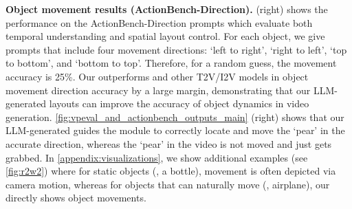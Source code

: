 \documentclass{article}
\begin{document}
\vspace{3pt}
\noindent\textbf{Object movement results (ActionBench-Direction).}
 (right) shows the performance on the ActionBench-Direction prompts which evaluate both temporal understanding and spatial layout control.
For each object, we give prompts that include four movement directions: ‘left to right’, ‘right to left’, ‘top to bottom’, and ‘bottom to top’. Therefore, for a random guess, the movement accuracy is 25\%.
Our \method{} outperforms \modelscope{} and other T2V/I2V models in object movement direction accuracy by a large margin, demonstrating that our LLM-generated layouts can improve the accuracy of object dynamics in video generation.
\cref{fig:vpeval_and_actionbench_outputs_main} (right) shows that our LLM-generated \videoplan{} guides the \videomodule{} module to correctly locate and move the `pear' in the accurate direction,
whereas the `pear' in the \modelscope{} video is not moved and just gets grabbed.
In \cref{appendix:visualizations}, we show additional examples (see \cref{fig:r2w2}) where for static objects (\eg{}, a bottle), movement is often depicted via camera motion, whereas for objects that can naturally move (\eg{}, airplane), our \method{} directly shows object movements.





\begin{table}
\centering
{}
\caption{
    Comparison results on MSR-VTT.
    \modelscope{}$^\dagger$:
    Our replication
    on the same 2990 random test prompts.
}
\label{table:msrvtt}
\end{table}
\end{document}
